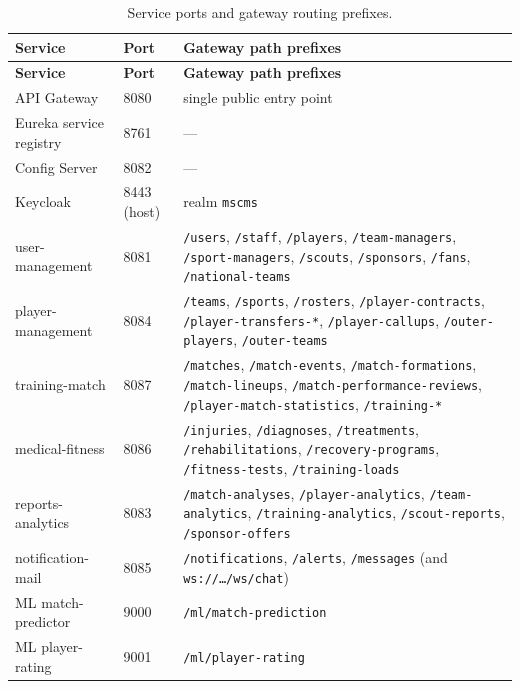 \begin{longtable}{p{} p{} p{}}
\caption{Service ports and gateway routing prefixes.}
\label{tab:app-ports}\\
\toprule
\textbf{Service} & \textbf{Port} & \textbf{Gateway path prefixes} \\
\midrule
\endfirsthead
\toprule
\textbf{Service} & \textbf{Port} & \textbf{Gateway path prefixes} \\
\midrule
\endhead
\bottomrule
\endlastfoot
API Gateway & 8080 & single public entry point \\
Eureka service registry & 8761 & --- \\
Config Server & 8082 & --- \\
Keycloak & 8443 (host) & realm \texttt{mscms} \\
user-management & 8081 & \texttt{/users}, \texttt{/staff}, \texttt{/players}, \texttt{/team-managers}, \texttt{/sport-managers}, \texttt{/scouts}, \texttt{/sponsors}, \texttt{/fans}, \texttt{/national-teams} \\
player-management & 8084 & \texttt{/teams}, \texttt{/sports}, \texttt{/rosters}, \texttt{/player-contracts}, \texttt{/player-transfers-*}, \texttt{/player-callups}, \texttt{/outer-players}, \texttt{/outer-teams} \\
training-match & 8087 & \texttt{/matches}, \texttt{/match-events}, \texttt{/match-formations}, \texttt{/match-lineups}, \texttt{/match-performance-reviews}, \texttt{/player-match-statistics}, \texttt{/training-*} \\
medical-fitness & 8086 & \texttt{/injuries}, \texttt{/diagnoses}, \texttt{/treatments}, \texttt{/rehabilitations}, \texttt{/recovery-programs}, \texttt{/fitness-tests}, \texttt{/training-loads} \\
reports-analytics & 8083 & \texttt{/match-analyses}, \texttt{/player-analytics}, \texttt{/team-analytics}, \texttt{/training-analytics}, \texttt{/scout-reports}, \texttt{/sponsor-offers} \\
notification-mail & 8085 & \texttt{/notifications}, \texttt{/alerts}, \texttt{/messages} (and \texttt{ws://\dots/ws/chat}) \\
ML match-predictor & 9000 & \texttt{/ml/match-prediction} \\
ML player-rating & 9001 & \texttt{/ml/player-rating} \\
\end{longtable}


